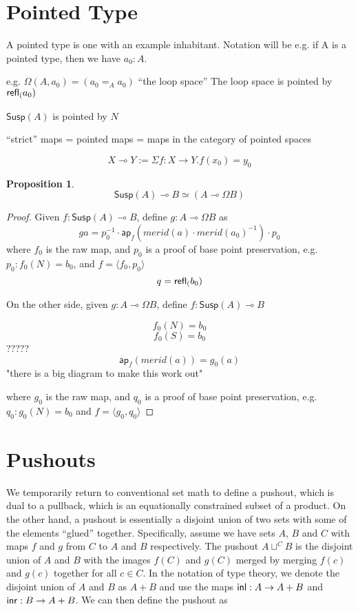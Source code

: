 \documentclass[11pt]{article}
\newcommand{\lolli}{\multimap}
\newcommand*{\ap}{\mathsf{ap}}
\newcommand{\susp}[1]{\mathsf{Susp}(#1)}
\newtheorem{proposition}{Proposition}
\begin{document}
\section{Pointed Type}
A pointed type is one with an example inhabitant. Notation will be e.g. if A is a pointed type, then we have $a_0 : A$.

e.g. $\Omega(A, a_0) = (a_0 =_A a_0)$ ``the loop space''
The loop space is pointed by $\mathsf{refl}_{(} a_0)$

$\susp{A}$ is pointed by $N$

``strict'' maps = pointed maps = maps in the category of pointed spaces

$$X \lolli Y := \Sigma f : X \to Y . f(x_0) = y_0$$
\begin{proposition}
$$\susp{A} \lolli B \simeq (A \lolli \Omega B)$$
\end{proposition}
\begin{proof}
Given $f : \susp{A} \lolli B$, define $g : A \lolli \Omega B$ as
$$g a = p_0^{-1} \cdot \ap_f(merid(a) \cdot merid(a_0)^{-1}) \cdot p_0$$
where $f_0$ is the raw map, and $p_0$ is a proof of base point preservation, e.g. $p_0 : f_0(N) = b_0$, and $f = \langle f_0, p_0\rangle$
$$q = \mathsf{refl}_{(} b_0)$$

On the other side, given $g : A \lolli \Omega B$, define $f : \susp{A} \lolli B$

$$f_0(N) = b_0$$
$$f_0(S) = b_0$$
?????
$$\ap_f(merid(a)) = g_0(a)$$
"there is a big diagram to make this work out"

where $g_0$ is the raw map, and $q_0$ is a proof of base point preservation, e.g. $q_0 : g_0(N) = b_0$ and $f = \langle g_0, q_0\rangle$
\end{proof}

\section{Pushouts}
We temporarily return to conventional set math to define a pushout, which is
dual to a pullback, which is an equationally constrained subset of a product.
On the other hand, a pushout is essentially a disjoint union of two sets 
with some of the elements ``glued'' together. Specifically, assume we have
sets $A$, $B$ and $C$ with maps $f$ and $g$ from $C$ to $A$ and $B$ 
respectively. The pushout 
$A \sqcup^C B$ is the disjoint union of $A$ and $B$ with the images $f(C)$ and
$g(C)$ merged by merging $f(c)$ and $g(c)$ together for all $c \in C$. In the
notation of type theory, we denote the disjoint union of $A$ and $B$ as 
$A + B$ and use the maps ${\mathsf{inl}}: A \to A + B$ and ${\mathsf{inr}}: B \to A + B$. We
can then define the pushout as
\end{document}

